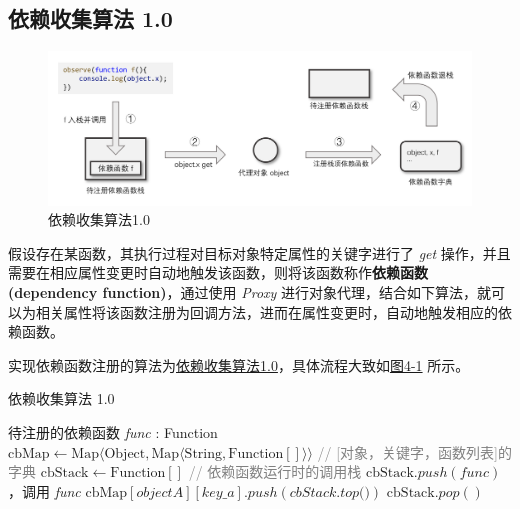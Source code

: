 \documentclass[winfonts,master,twoside]{njuthesis}
\begin{document}
\subsection{依赖收集算法 1.0}

\begin{figure}[h]
    \centering
    \includegraphics[width=\textwidth]{figure/chapter-3/algorithm1.0-update.png}
    \caption{依赖收集算法1.0}
    \label{algorithm-1.0}
\end{figure}

假设存在某函数，其执行过程对目标对象特定属性的关键字进行了 \textit{get} 操作，并且需要在相应属性变更时自动地触发该函数，则将该函数称作\textbf{依赖函数(dependency function)}，通过使用 \textit{Proxy} 进行对象代理，结合如下算法，就可以为相关属性将该函数注册为回调方法，进而在属性变更时，自动地触发相应的依赖函数。

实现依赖函数注册的算法为\hyperref[dependency-collect-algorithm-1.0]{依赖收集算法1.0}，具体流程大致如\hyperref[algorithm-1.0]{图4-1} 所示。

\begin{algorithm}[H]
    \caption{依赖收集算法 1.0}
    \label{dependency-collect-algorithm-1.0}
    \begin{algorithmic}[1]
        \REQUIRE 待注册的依赖函数 \textit{func} : Function
        \STATE $\text{cbMap} \gets \text{Map}\langle \text{Object}, \text{Map}\langle \text{String}, \text{Function}[]\rangle\rangle$ \footnotesize\textcolor{gray}{// [对象，关键字，函数列表]的字典}\normalsize
        \STATE $\text{cbStack} \gets \text{Function}[]$ \footnotesize\textcolor{gray}{// 依赖函数运行时的调用栈}\normalsize
        \STATE $\text{cbStack}.push(\textit{func})$，调用 \textit{func}
        \STATE $\text{cbMap}[objectA][key\_a].push(\textit{cbStack.top()})$
        \ENDIF
        \ENDIF
        \ENDWHILE
        \STATE $\text{cbStack}.pop()$
    \end{algorithmic}
\end{algorithm}
\end{document}
